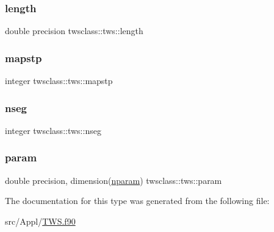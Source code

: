 \subsubsection{\texorpdfstring{length}{length}}
{\footnotesize\ttfamily double precision twsclass\+::tws\+::length}

\mbox{\label{structtwsclass_1_1tws_a023933666722b8509103d43f82f3c251}} 
\subsubsection{\texorpdfstring{mapstp}{mapstp}}
{\footnotesize\ttfamily integer twsclass\+::tws\+::mapstp}

\mbox{\label{structtwsclass_1_1tws_a9977eae9217b979dc25554e7f3453339}} 
\subsubsection{\texorpdfstring{nseg}{nseg}}
{\footnotesize\ttfamily integer twsclass\+::tws\+::nseg}

\mbox{\label{structtwsclass_1_1tws_ada2bbea749395b11dbf0f9d8b27b5fcf}} 
\subsubsection{\texorpdfstring{param}{param}}
{\footnotesize\ttfamily double precision, dimension(\mbox{\hyperlink{namespacetwsclass_ae92106a92b2952cbb34ae48df4c6b375}{nparam}}) twsclass\+::tws\+::param}



The documentation for this type was generated from the following file\+:\begin{DoxyCompactItemize}
\item 
src/\+Appl/\mbox{\hyperlink{_t_w_s_8f90}{T\+W\+S.\+f90}}\end{DoxyCompactItemize}
